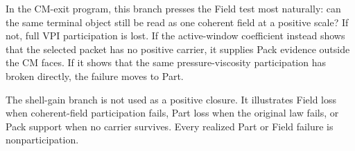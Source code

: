 In the CM-exit program, this branch presses the Field test most naturally: can
the same terminal object still be read as one coherent field at a positive
scale?  If not, full VPI participation is lost.  If the active-window
coefficient instead shows that the selected
packet has no positive carrier, it supplies Pack evidence outside the CM faces.
If it shows that the same pressure-viscosity participation has broken directly,
the failure moves to Part.

The shell-gain branch is not used as a positive closure.  It illustrates Field
loss when coherent-field participation fails, Part loss when the original law
fails, or Pack support when no carrier survives.  Every realized Part or Field
failure is nonparticipation.
